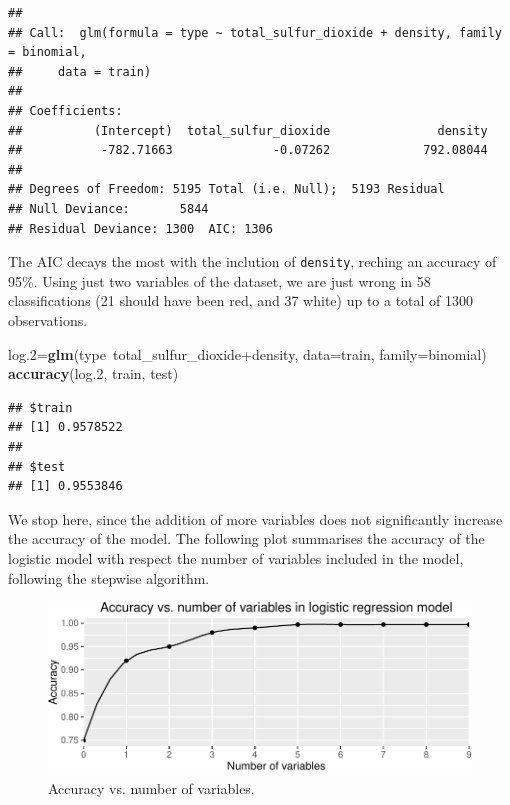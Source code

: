 \documentclass[12pt,]{article}
\newenvironment{Shaded}{\begin{snugshade}}{\end{snugshade}}
\newcommand{\KeywordTok}[1]{\textcolor[rgb]{0.13,0.29,0.53}{\textbf{{#1}}}}
\newcommand{\DataTypeTok}[1]{\textcolor[rgb]{0.13,0.29,0.53}{{#1}}}
\newcommand{\FloatTok}[1]{\textcolor[rgb]{0.00,0.00,0.81}{{#1}}}
\newcommand{\NormalTok}[1]{{#1}}
\begin{document}
\begin{verbatim}
## 
## Call:  glm(formula = type ~ total_sulfur_dioxide + density, family = binomial, 
##     data = train)
## 
## Coefficients:
##          (Intercept)  total_sulfur_dioxide               density  
##           -782.71663              -0.07262             792.08044  
## 
## Degrees of Freedom: 5195 Total (i.e. Null);  5193 Residual
## Null Deviance:       5844 
## Residual Deviance: 1300  AIC: 1306
\end{verbatim}

The AIC decays the most with the inclution of \texttt{density}, reching
an accuracy of 95\%. Using just two variables of the dataset, we are
just wrong in 58 classifications (21 should have been red, and 37 white)
up to a total of 1300 observations.

\begin{Shaded}
\begin{Highlighting}[]
\NormalTok{log}\FloatTok{.2}\NormalTok{=}\KeywordTok{glm}\NormalTok{(type~total_sulfur_dioxide+density, }\DataTypeTok{data=}\NormalTok{train, }\DataTypeTok{family=}\NormalTok{binomial)}
\KeywordTok{accuracy}\NormalTok{(log}\FloatTok{.2}\NormalTok{, train, test)}
\end{Highlighting}
\end{Shaded}

\begin{verbatim}
## $train
## [1] 0.9578522
## 
## $test
## [1] 0.9553846
\end{verbatim}

We stop here, since the addition of more variables does not
significantly increase the accuracy of the model. The following plot
summarises the accuracy of the logistic model with respect the number of
variables included in the model, following the stepwise algorithm.

\begin{figure}

{\centering \includegraphics{logistic-regression_files/figure-latex/model_comparison-1} 

}

\caption{Accuracy vs. number of variables.}\label{fig:model_comparison}
\end{figure}
\end{document}
